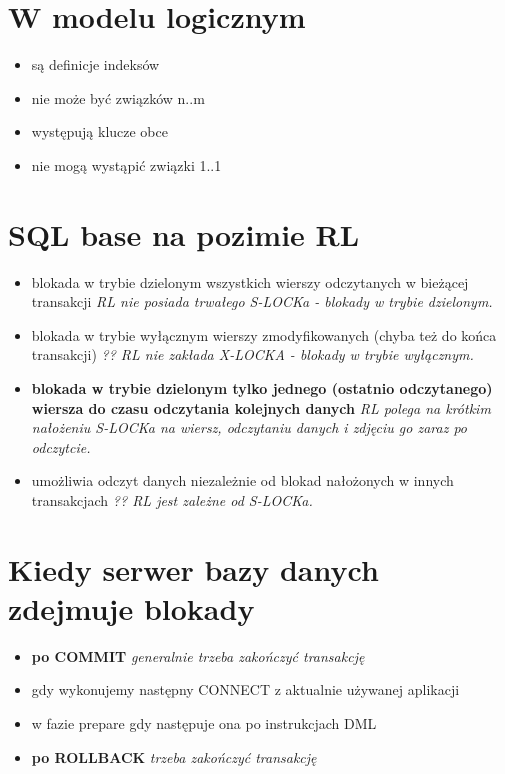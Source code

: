 \documentclass[a4paper,twoside]{article}
\begin{document}
  \section{W modelu logicznym}
      \begin{itemize}
      \item są definicje indeksów
      \item nie może być związków n..m
      \item występują klucze obce
      \item nie mogą wystąpić związki 1..1
      \end{itemize}

  \section{SQL base na pozimie RL}
      \begin{itemize}
      \item blokada w trybie dzielonym wszystkich wierszy odczytanych w bieżącej transakcji \emph{RL nie posiada trwałego S-LOCKa - blokady w trybie dzielonym.}
      \item blokada w trybie wyłącznym wierszy zmodyfikowanych (chyba też do końca transakcji) \emph{?? RL nie zakłada X-LOCKA - blokady w trybie wyłącznym.}
      \item \textbf{blokada w trybie dzielonym tylko jednego (ostatnio odczytanego) wiersza do czasu odczytania kolejnych danych} \emph{RL polega na krótkim nałożeniu S-LOCKa na wiersz, odczytaniu danych i zdjęciu go zaraz po odczytcie.}
      \item umożliwia odczyt danych niezależnie od blokad nałożonych w innych transakcjach \emph{?? RL jest zależne od S-LOCKa.}
      \end{itemize}

  \section{Kiedy serwer bazy danych zdejmuje blokady}
      \begin{itemize}
      \item \textbf{po COMMIT} \emph{generalnie trzeba zakończyć transakcję}
      \item gdy wykonujemy następny CONNECT z aktualnie używanej aplikacji
      \item w fazie prepare gdy następuje ona po instrukcjach DML
      \item \textbf{po ROLLBACK} \emph{trzeba zakończyć transakcję}
      \end{itemize}
\end{document}

